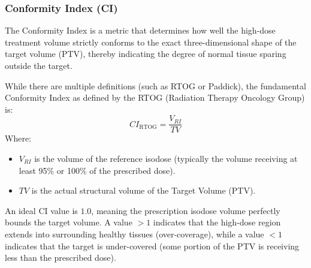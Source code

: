 \subsubsection{Conformity Index (CI)}
The Conformity Index is a metric that determines how well the high-dose treatment volume strictly conforms to the exact three-dimensional shape of the target volume (PTV), thereby indicating the degree of normal tissue sparing outside the target.

While there are multiple definitions (such as RTOG or Paddick), the fundamental Conformity Index as defined by the RTOG (Radiation Therapy Oncology Group) is:
\begin{equation}
    CI_{\text{RTOG}} = \frac{V_{RI}}{TV}
\end{equation}
Where:
\begin{itemize}
    \item $V_{RI}$ is the volume of the reference isodose (typically the volume receiving at least 95\% or 100\% of the prescribed dose).
    \item $TV$ is the actual structural volume of the Target Volume (PTV).
\end{itemize}
An ideal CI value is $1.0$, meaning the prescription isodose volume perfectly bounds the target volume. A value $> 1$ indicates that the high-dose region extends into surrounding healthy tissues (over-coverage), while a value $< 1$ indicates that the target is under-covered (some portion of the PTV is receiving less than the prescribed dose).
